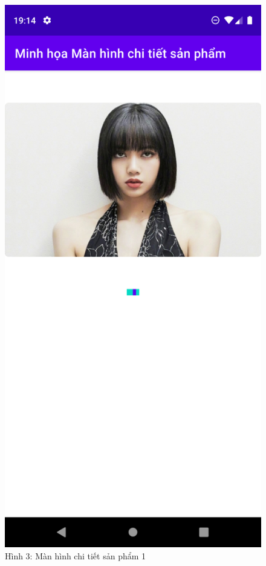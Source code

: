 \documentclass{beamer}
\begin{document}
\begin{frame}
    \begin{columns}
        \begin{figure}
            \centering
            \includegraphics[height=0.7\textheight]{images/34.png}
            \caption{\centering\tiny{Hình 3: Màn hình chi tiết sản phẩm 1}}


\end{figure}
\end{columns}
\end{frame}
\end{document}
